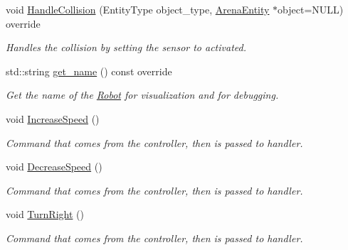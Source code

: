 \begin{DoxyCompactItemize}
\mbox{\label{class_robot_a4fc6b01fec869b559197d8e4b9686249}} 
void \mbox{\hyperlink{class_robot_a4fc6b01fec869b559197d8e4b9686249}{Handle\+Collision}} (Entity\+Type object\+\_\+type, \mbox{\hyperlink{class_arena_entity}{Arena\+Entity}} $\ast$object=N\+U\+LL) override
\begin{DoxyCompactList}\small\item\em Handles the collision by setting the sensor to activated. \end{DoxyCompactList}\item 
\mbox{\label{class_robot_a3f77c13705b8f60480d21d8d936dc39e}} 
std\+::string \mbox{\hyperlink{class_robot_a3f77c13705b8f60480d21d8d936dc39e}{get\+\_\+name}} () const override
\begin{DoxyCompactList}\small\item\em Get the name of the \mbox{\hyperlink{class_robot}{Robot}} for visualization and for debugging. \end{DoxyCompactList}\item 
\mbox{\label{class_robot_ae4647cccd002ca13659017e634237ead}} 
void \mbox{\hyperlink{class_robot_ae4647cccd002ca13659017e634237ead}{Increase\+Speed}} ()
\begin{DoxyCompactList}\small\item\em Command that comes from the controller, then is passed to handler. \end{DoxyCompactList}\item 
\mbox{\label{class_robot_a94afa6f63eb22667261c07933faae481}} 
void \mbox{\hyperlink{class_robot_a94afa6f63eb22667261c07933faae481}{Decrease\+Speed}} ()
\begin{DoxyCompactList}\small\item\em Command that comes from the controller, then is passed to handler. \end{DoxyCompactList}\item 
\mbox{\label{class_robot_a12b5883779f682c66e71bc54b6539694}} 
void \mbox{\hyperlink{class_robot_a12b5883779f682c66e71bc54b6539694}{Turn\+Right}} ()
\begin{DoxyCompactList}\small\item\em Command that comes from the controller, then is passed to handler. \end{DoxyCompactList}\item 

\end{DoxyCompactItemize}
